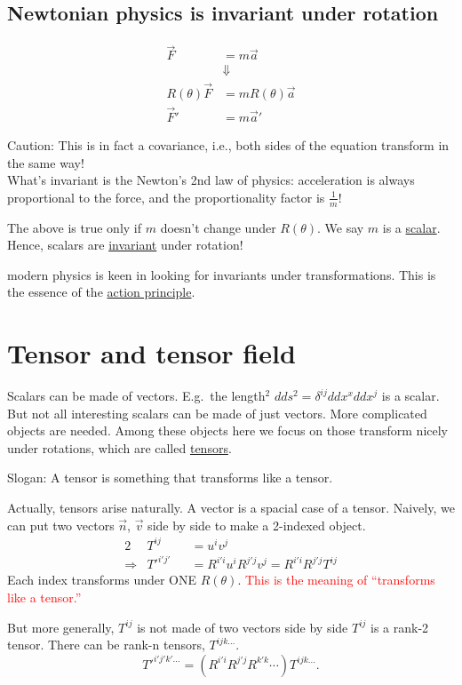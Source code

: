 \documentclass[11pt,fleqn]{book} %
\begin{document}
\subsection{Newtonian physics is invariant under rotation}
\begin{align*}
  \vec{F}           &= m \vec{a}           \\
                    &\Downarrow            \\
  R(\theta) \vec{F} &= m R(\theta) \vec{a} \\
  \vec{F}'          &= m \vec{a}'
\end{align*}
\begin{emphbox}
  Caution: This is in fact a covariance, i.e., both sides of the equation
  transform in the same way! \\
  What's invariant is the Newton's 2nd law of physics: acceleration is always
  proportional to the force, and the proportionality factor is \(\frac{1}{m}\)!
\end{emphbox}
The above is true only if \(m\) doesn't change under \(R(\theta)\). We say \(m\)
is a \uline{scalar}. \\
Hence, scalars are \uline{invariant} under rotation!
\begin{remark}
  modern physics is keen in looking for invariants under transformations. This
  is the essence of the \uline{action principle}.
\end{remark}

\section{Tensor and tensor field}
Scalars can be made of vectors.
E.g.\ the length\(^2\) \(dd s^2 = \delta^{ij} dd x^x
dd x^j\) is a scalar. \\
But not all interesting scalars can be made of just vectors. More complicated
objects are needed. Among these objects here we focus on those transform nicely
under rotations, which are called \uline{tensors}.
\begin{emphbox}
  Slogan: A tensor is something that transforms like a tensor.
\end{emphbox}
\begin{remark}
  Actually, tensors arise naturally. A vector is a spacial case of a tensor.
  Naively, we can put two vectors \(\vec{n}\), \(\vec{v}\) side by side to make a
  2-indexed object.
  \begin{alignat*}{2}
    & T^{ij} &&= u^i v^j \\
    \Rightarrow & T'^{i'j'} &&= R^{i'i} u^i R^{j'j} v^j = R^{i'i} R^{j'j} T^{ij}
  \end{alignat*}
  Each index transforms under \uppercase{one} \(R(\theta)\). \textcolor{red}{This is the meaning of
  ``transforms like a tensor.''}
\end{remark}
But more generally, \(T^{ij}\) is not made of two vectors side by side
\(T^{ij}\) is a rank-2 tensor. There can be rank-n tensors, \(T^{ijk\dots}\).
\[T'^{i'j'k'\dots} = \left(R^{i'i} R^{j'j} R^{k'k} \cdots\right) T^{ijk\dots}.\]
\end{document}
